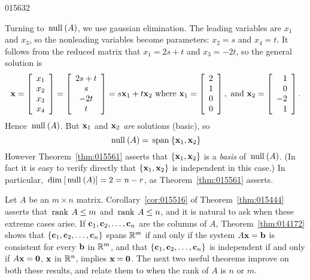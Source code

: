 {{\begin{example}{}{015632}
\begin{solution}
Turning to $\thinspace\operatorname{null\medspace}(A)$, we use gaussian elimination. The leading variables are $x_{1}$ and $x_{3}$, so the nonleading variables become parameters: $x_{2} = s$ and $x_{4} = t$. It follows from the reduced matrix that $x_{1} = 2s + t$ and $x_{3} = -2t$, so the general solution is
\begin{equation*}
\textbf{x} = 
\left[ \begin{array}{r}
x_1\\
x_2\\
x_3\\
x_4
\end{array} \right] = \left[ \begin{array}{c}
2s + t\\
s\\
-2t\\
t
\end{array} \right] = s\textbf{x}_1 + t\textbf{x}_2 \mbox{ where } \textbf{x}_1 = 
\left[ \begin{array}{r}
2\\
1\\
0\\
0
\end{array} \right], \mbox{ and } \textbf{x}_2 =
\left[ \begin{array}{r}
1\\
0\\
-2\\
1
\end{array} \right].
\end{equation*}
Hence $\thinspace\operatorname{null\medspace}(A)$. But $\textbf{x}_{1}$ and $\textbf{x}_{2}$ \textit{are} solutions (basic), so
\begin{equation*}
\thinspace\operatorname{null\medspace}(A) = \thinspace\operatorname{span\medspace}\{\textbf{x}_1, \textbf{x}_2 \}
\end{equation*}
However Theorem~\ref{thm:015561} asserts that $\{\textbf{x}_{1}, \textbf{x}_{2}\}$ is a \textit{basis} of $\thinspace\operatorname{null\medspace}(A)$. (In fact it is easy to verify directly that $\{\textbf{x}_{1}, \textbf{x}_{2}\}$ is independent in this case.) In particular, $\thinspace\operatorname{dim\medspace}[\thinspace\operatorname{null\medspace}(A)] = 2 = n - r$, as Theorem~\ref{thm:015561} asserts.
\end{solution}
\end{example}

Let $A$ be an $m \times n$ matrix. Corollary~\ref{cor:015516} of Theorem~\ref{thm:015444} asserts that $\thinspace\operatorname{rank\medspace} A \leq m$ and $\thinspace\operatorname{rank\medspace} A \leq n$, and it is natural to ask when these extreme cases arise. If $\textbf{c}_{1}, \textbf{c}_{2}, \dots, \textbf{c}_{n}$ are the columns of $A$, Theorem~\ref{thm:014172} shows that $\{\textbf{c}_{1}, \textbf{c}_{2}, \dots, \textbf{c}_{n}\}$ spans $\mathbb{R}^m$ if and only if the system $A\textbf{x} = \textbf{b}$ is consistent for every $\textbf{b}$ in $\mathbb{R}^m$, and that $\{\textbf{c}_{1}, \textbf{c}_{2}, \dots, \textbf{c}_{n}\}$ is independent if and only if $A\textbf{x} = \textbf{0}$, $\textbf{x}$ in $\mathbb{R}^n$, implies $\textbf{x} = \textbf{0}$. The next two useful theorems improve on both these results, and relate them to when the rank of $A$ is $n$ or $m$.

}}
